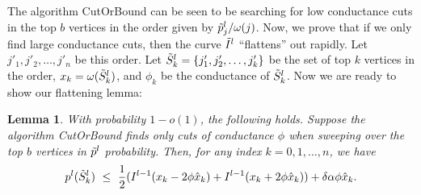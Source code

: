 \documentclass[11pt]{article}
\newtheorem{Lem}[theorem]{Lemma}
\newcommand\CutOrBound{{\sc CutOrBound}\xspace}
\newcommand\volls{\omega}
\begin{document}
The algorithm \CutOrBound can be seen to be searching for low conductance cuts in the top $b$ vertices in the order given by $\ptil^l_j/\volls(j)$. Now, we prove that if we only find large conductance cuts, then the curve $\tilde{I}^l$ ``flattens'' out rapidly. Let $j'_1, j'_2, \ldots, j'_n$ be this order.
Let $\tilde{S}^l_k = \{j'_1, j'_2, \ldots, j'_k\}$ be the set of top $k$ vertices in the order, $x_k = \volls(\Stil^l_k)$, and $\phi_k$ be the conductance of $\tilde{S}^l_k$. Now we are ready to show our flattening lemma:
\begin{Lem} \label{lem:ls-chords-empirical} With probability $1 - o(1)$, the
following holds. Suppose the algorithm \CutOrBound finds only cuts of conductance $\phi$ when sweeping over the top $b$ vertices in $\tilde{p}^l$ probability. Then, for any index $k = 0, 1, \ldots, n$, we have
$$p^l(\Stil^l_k)\ \leq\ \frac{1}{2}(I^{l-1}(x_k - 2\phi\hat{x}_k) + I^{l-1}(x_k + 2\phi\hat{x}_k)) + \delta\alpha \phi\hat{x}_k.$$
\end{Lem}
\end{document}
